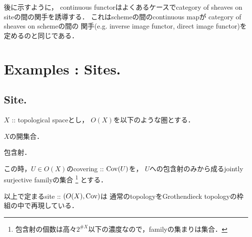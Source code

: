 \documentclass[a4paper]{jsarticle}
\begin{document}
\begin{Remark}
    後に示すように，
    continuous functorはよくあるケースでcategory of sheaves on siteの間の関手を誘導する．
    これはschemeの間のcontinuous mapが
    category of sheaves on schemeの間の
    関手(e.g. inverse image functor, direct image functor)を定めるのと同じである．
\end{Remark}

\section{Examples : Sites.}
\subsection{Site.}
\begin{Example}
    $X$ :: topological spaceとし，
    $O(X)$を以下のような圏とする．
    \begin{description}[labelindent=5mm]
        \item[対象] $X$の開集合．
        \item[射] 包含射．
    \end{description}
    この時，$U \in O(X)$のcovering :: $\operatorname{Cov}(U)$を，
    $U$への包含射のみから成るjointly surjective familyの集合
    \footnote{ 包含射の個数は高々$2^{\#X}$以下の濃度なので，familyの集まりは集合． }
    とする．

    以上で定まるsite :: $(O(X), \operatorname{Cov})$は
    通常のtopologyをGrothendieck topologyの枠組の中で再現している．
\end{Example}
\end{document}
